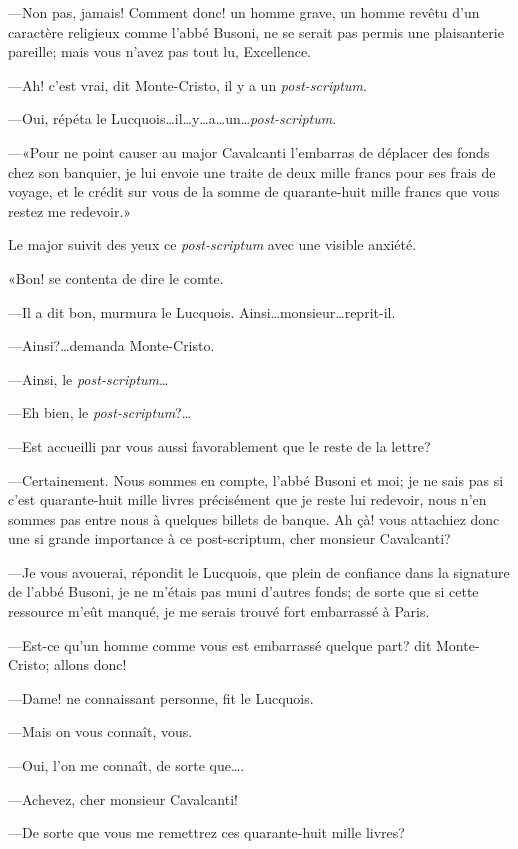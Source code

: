 —Non pas, jamais! Comment donc! un homme grave, un homme revêtu d'un caractère religieux comme l'abbé Busoni, ne se serait pas permis une plaisanterie pareille; mais vous n'avez pas tout lu, Excellence. 

—Ah! c'est vrai, dit Monte-Cristo, il y a un \textit{post-scriptum}. 

—Oui, répéta le Lucquois\dots il\dots y\dots a\dots un\dots \textit{post-scriptum}. 

—«Pour ne point causer au major Cavalcanti l'embarras de déplacer des fonds chez son banquier, je lui envoie une traite de deux mille francs pour ses frais de voyage, et le crédit sur vous de la somme de quarante-huit mille francs que vous restez me redevoir.» 

Le major suivit des yeux ce \textit{post-scriptum} avec une visible anxiété. 

«Bon! se contenta de dire le comte. 

—Il a dit bon, murmura le Lucquois. Ainsi\dots monsieur\dots reprit-il. 

—Ainsi?\dots demanda Monte-Cristo. 

—Ainsi, le \textit{post-scriptum}\dots 

—Eh bien, le \textit{post-scriptum}?\dots 

—Est accueilli par vous aussi favorablement que le reste de la lettre? 

—Certainement. Nous sommes en compte, l'abbé Busoni et moi; je ne sais pas si c'est quarante-huit mille livres précisément que je reste lui redevoir, nous n'en sommes pas entre nous à quelques billets de banque. Ah çà! vous attachiez donc une si grande importance à ce post-scriptum, cher monsieur Cavalcanti? 

—Je vous avouerai, répondit le Lucquois, que plein de confiance dans la signature de l'abbé Busoni, je ne m'étais pas muni d'autres fonds; de sorte que si cette ressource m'eût manqué, je me serais trouvé fort embarrassé à Paris. 

—Est-ce qu'un homme comme vous est embarrassé quelque part? dit Monte-Cristo; allons donc! 

—Dame! ne connaissant personne, fit le Lucquois. 

—Mais on vous connaît, vous. 

—Oui, l'on me connaît, de sorte que\dots. 

—Achevez, cher monsieur Cavalcanti! 

—De sorte que vous me remettrez ces quarante-huit mille livres? 

